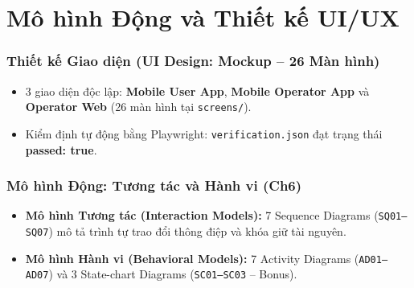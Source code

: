\section{Mô hình Động và Thiết kế UI/UX}

\begin{frame}
\frametitle{Thiết kế Giao diện (UI Design: Mockup -- 26 Màn hình)}
\begin{itemize}
    \item 3 giao diện độc lập: \textbf{Mobile User App}, \textbf{Mobile Operator App} và \textbf{Operator Web} (26 màn hình tại \texttt{screens/}).
    \item Kiểm định tự động bằng Playwright: \texttt{verification.json} đạt trạng thái \textbf{passed: true}.
\end{itemize}
\end{frame}

\begin{frame}
\frametitle{Mô hình Động: Tương tác và Hành vi (Ch6)}
\begin{itemize}
    \item \textbf{Mô hình Tương tác (Interaction Models):} 7 Sequence Diagrams (\texttt{SQ01--SQ07}) mô tả trình tự trao đổi thông điệp và khóa giữ tài nguyên.
    \item \textbf{Mô hình Hành vi (Behavioral Models):} 7 Activity Diagrams (\texttt{AD01--AD07}) và 3 State-chart Diagrams (\texttt{SC01--SC03} -- Bonus).
\end{itemize}
\end{frame}
